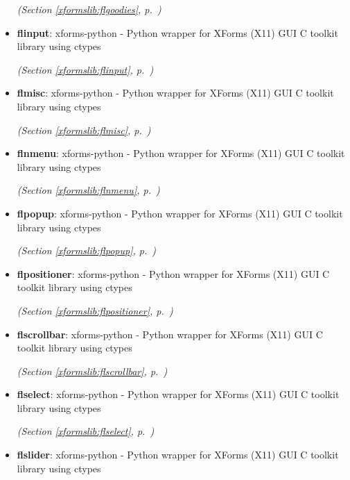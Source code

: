 \begin{itemize}
  \textit{(Section \ref{xformslib:flgoodies}, p.~\pageref{xformslib:flgoodies})}

\item \textbf{flinput}: xforms-python - Python wrapper for XForms (X11) GUI C toolkit library using
ctypes



  \textit{(Section \ref{xformslib:flinput}, p.~\pageref{xformslib:flinput})}

\item \textbf{flmisc}: xforms-python - Python wrapper for XForms (X11) GUI C toolkit library using
ctypes



  \textit{(Section \ref{xformslib:flmisc}, p.~\pageref{xformslib:flmisc})}

\item \textbf{flnmenu}: xforms-python - Python wrapper for XForms (X11) GUI C toolkit library using
ctypes



  \textit{(Section \ref{xformslib:flnmenu}, p.~\pageref{xformslib:flnmenu})}

\item \textbf{flpopup}: xforms-python - Python wrapper for XForms (X11) GUI C toolkit library using
ctypes



  \textit{(Section \ref{xformslib:flpopup}, p.~\pageref{xformslib:flpopup})}

\item \textbf{flpositioner}: xforms-python - Python wrapper for XForms (X11) GUI C toolkit library using
ctypes



  \textit{(Section \ref{xformslib:flpositioner}, p.~\pageref{xformslib:flpositioner})}

\item \textbf{flscrollbar}: xforms-python - Python wrapper for XForms (X11) GUI C toolkit library using
ctypes



  \textit{(Section \ref{xformslib:flscrollbar}, p.~\pageref{xformslib:flscrollbar})}

\item \textbf{flselect}: xforms-python - Python wrapper for XForms (X11) GUI C toolkit library using
ctypes



  \textit{(Section \ref{xformslib:flselect}, p.~\pageref{xformslib:flselect})}

\item \textbf{flslider}: xforms-python - Python wrapper for XForms (X11) GUI C toolkit library using
ctypes




\end{itemize}
